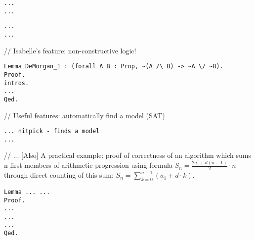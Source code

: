 \documentclass[article]{aaltoseries}
\begin{document}
\begin{lstlisting}[caption={Non-recursive function definition: factorial}]
...
...
\end{lstlisting}

\begin{lstlisting}[caption={Inductive data type definition: list}]
...
...
\end{lstlisting}

// Isabelle's feature: non-constructive logic!
\begin{lstlisting}[caption={Propositional logic proof to the contrary}]
Lemma DeMorgan_1 : (forall A B : Prop, ~(A /\ B) -> ~A \/ ~B).
Proof.
intros.
...
Qed.
\end{lstlisting}

// Useful features: automatically find a model (SAT)
\begin{lstlisting}[caption={Isabelle as an SAT solver}]
... nitpick - finds a model
...
\end{lstlisting}





// ... [Also] A practical example: proof of correctness of an algorithm which sums n first members of arithmetic progression using formula $S_{n} = { {\frac {2 a_{1} + d (n - 1)}{2} \cdot n}}$ through direct counting of this sum: $S_{n} = \sum\limits_{k=0}^{n-1} (a_{1} + d \cdot k)$.
\begin{lstlisting}[caption={First-order logic proof: formula of the sum of n first members of arithmetic progression}]
Lemma ... ... 
Proof.
...
...
...
Qed.
\end{lstlisting}




\end{document}
